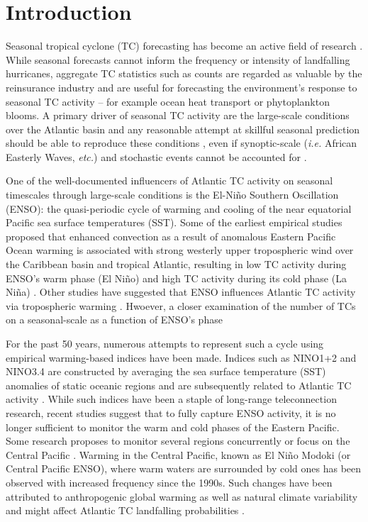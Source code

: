 \section{Introduction}
Seasonal tropical cyclone (TC) forecasting has become an active field of research \cite{elsner1993, elsner1998, elsner2008, klotzbach2009}. While seasonal forecasts cannot inform the frequency or intensity of landfalling hurricanes, aggregate TC statistics such as counts are regarded as valuable by the reinsurance industry and are useful for forecasting the environment's response to seasonal TC activity -- for example ocean heat transport or phytoplankton blooms. A primary driver of seasonal TC activity are the large-scale conditions over the Atlantic basin and any reasonable attempt at skillful seasonal prediction should be able to reproduce these conditions \cite{gray1968}, even if synoptic-scale (\emph{i.e.} African Easterly Waves, \emph{etc.}) and stochastic events cannot be accounted for \cite{Knutson2007, Emanuel2008Simulation}.

One of the well-documented influencers of Atlantic TC activity on seasonal timescales through large-scale conditions is the El-Ni\~no Southern Oscillation (ENSO): the quasi-periodic cycle of warming and cooling of the near equatorial Pacific sea surface temperatures (SST). Some of the earliest empirical studies proposed that enhanced convection as a result of anomalous Eastern Pacific Ocean warming is associated with strong westerly upper tropospheric wind over the Caribbean basin and tropical Atlantic, resulting in low TC activity during ENSO's warm phase (El Ni\~no) and high TC activity during its cold phase (La Ni\~na) \cite{gray1984a}. Other studies have suggested that ENSO influences Atlantic TC activity via tropospheric warming \cite{tang2004}. Hwoever, a closer examination of the number of TCs on a seasonal-scale as a function of ENSO's phase 

For the past 50 years, numerous attempts to represent such a cycle using empirical warming-based indices have been made. Indices such as NINO1+2 and NINO3.4 are constructed by averaging the sea surface temperature (SST) anomalies of static oceanic regions and are subsequently related to Atlantic TC activity \cite{trenberth1997definition}. While such indices have been a staple of long-range teleconnection research, recent studies suggest that to fully capture ENSO activity, it is no longer sufficient to monitor the warm and cold phases of the Eastern Pacific. Some research proposes to monitor several regions concurrently \cite{trenberth2001,ren2011} or focus on the Central Pacific \cite{ashok2007}. Warming in the Central Pacific, known as El Ni\~no Modoki (or Central Pacific ENSO), where warm waters are surrounded by cold ones has been observed with increased frequency since the 1990s. Such changes have been attributed to anthropogenic global warming \cite{yeh2009} as well as natural climate variability \cite{wittenberg2009} and might affect Atlantic TC landfalling probabilities \cite{kim2009}. 


